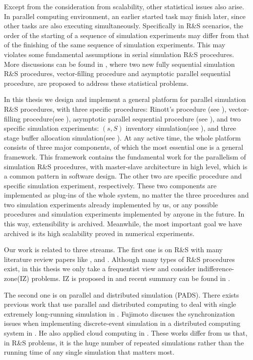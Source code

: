 Except from the consideration from scalability, other statistical issues also arise. In parallel computing environment, an earlier started task may finish later, since other tasks are also executing simultaneously. Specifically in R\&S scenarios, the order of the starting of a sequence of simulation experiments may differ from that of the finishing of the same sequence of simulation experiments. This may violates some fundamental assumptions in serial simulation R\&S procedures. More discussions can be found in \cite{ras-seq-parallel}, where two new fully sequential simulation R\&S procedures, vector-filling procedure and asymptotic parallel sequential procedure, are proposed to address these statistical problems.

In this thesis we design and implement a general platform for parallel simulation R\&S procedures, with three specific procedures: Rinott's procedure (see \cite{cistam1978rinott}), vector-filling procedure(see \cite{ras-seq-parallel}), asymptotic parallel sequential procedure (see \cite{ras-seq-parallel}), and two specific simulation experiments: $(s, S)$ inventory simulation(see \cite{cissac1985ss}), and three stage buffer allocation simulation(see \cite{smoms93threestage}). At any active time, the whole platform consists of three major components, of which the most essential one is a general framework. This framework contains the fundamental work for the parallelism of simulation R\&S procedures, with master-slave architecture in high level, which is a common pattern in software design. The other two are specific procedure and specific simulation experiment, respectively. These two components are implemented as plug-ins of the whole system, no matter the three procedures and two simulation experiments already implemented by us, or any possible procedures and simulation experiments implemented by anyone in the future. In this way, extensibility is archived. Meanwhile, the most important goal we have archived is its high scalability proved in numerical experiments.

Our work is related to three streams. The first one is on R\&S with many literature review papers like \cite{ras-recent-advances}, \cite{ehiorams06ras} and \cite{ms05ras}. Although many types of R\&S procedures exist, in this thesis we only take a frequentist view and consider indifference-zone(IZ) problems. IZ is proposed in \cite{toams1954iz} and recent summary can be found in \cite{nyjws95iz}.

The second one is on parallel and distributed simulation (PADS). There exists previous work that use parallel and distributed computing to deal with single extremely long-running simulation in \cite{potwsc05ras}. Fujimoto discuses the synchronization issues when implementing discrete-event simulation in a distributed computing system in \cite{cotacm90fuji}. He also applied cloud computing in \cite{scsmasm10fuji}. These works differ from us that, in R\&S problems, it is the huge number of repeated simulations rather than the running time of any single simulation that matters most.

